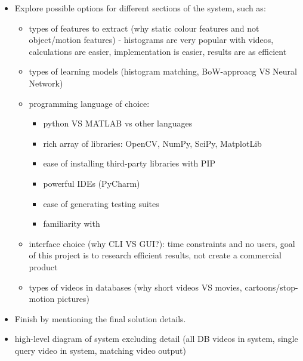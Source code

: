 \begin{itemize}
    \item Explore possible options for different sections of the system, such as:
    \begin{itemize}
        \item types of features to extract (why static colour features and not object/motion features) - histograms are very popular with videos, calculations are easier, implementation is easier, results are as efficient
        \item types of learning models (histogram matching, BoW-approacg VS Neural Network)
        \item programming language of choice:
        \begin{itemize}
            \item python VS MATLAB vs other languages
            \item rich array of libraries: OpenCV, NumPy, SciPy, MatplotLib
            \item ease of installing third-party libraries with PIP
            \item powerful IDEs (PyCharm)
            \item ease of generating testing suites
            \item familiarity with
        \end{itemize}
        \item interface choice (why CLI VS GUI?): time constraints and no users, goal of this project is to research efficient results, not create a commercial product
        \item types of videos in databases (why short videos VS movies, cartoons/stop-motion pictures)
    \end{itemize}
    \item Finish by mentioning the final solution details.
    \item high-level diagram of system excluding detail (all DB videos in system, single query video in system, matching video output)
\end{itemize}
